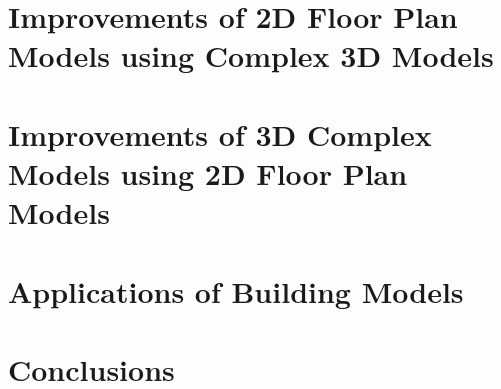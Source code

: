 \documentclass[12pt,onecolumn,oneside]{book}
\begin{document}
\chapter{Improvements of 2D Floor Plan Models using Complex 3D Models}
\label{ch:better_floorplans}



\chapter{Improvements of 3D Complex Models using 2D Floor Plan Models}
\label{ch:better_floorplans}



\chapter{Applications of Building Models}
\label{ch:applications}



\chapter{Conclusions}
\label{ch:conclusion}





%

\vfill

\end{document}
